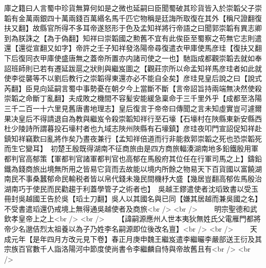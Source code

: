 庫之籍曰人言蜀中珍貨無算何如是之微也延嗣曰臣聞蜀破其珍貨皆入於崇韜父子崇韜有金萬兩銀四十萬兩錢百萬緡名馬千匹它物稱是廷誨所取復在其外【稱尺證翻復扶又翻】故縣官所得不多耳帝遂怒形于色及孟知祥將行帝語之曰聞郭崇韜有異志卿到為朕誅之【為于偽翻】知祥曰崇韜國之勲舊不宜有此俟臣至蜀察之苟無它志則遣還【還從宣翻又如字】帝許之壬子知祥發洛陽帝尋復遣衣甲庫使馬彦珪【復扶又翻下后復同衣甲庫使盛唐無之蓋帝所置亦内諸司使之一也】馳詣成都觀崇韜去就如奉詔班師則已若有遷延跋扈之狀則與繼岌圖之【觀莊宗所以命孟知祥馬彦珪者如此就使李從襲等不以劉后教行之崇韜得東還亦必不能自全矣】彦珪見皇后說之曰【說式芮翻】臣見向延嗣言蜀中事勢憂在朝夕今上當斷不斷【言帝詔旨持兩端無决然使殺崇韜之命斷丁亂翻】夫成敗之機間不容髪安能緩急稟命于三千里外乎【成都至洛陽三千二百一十六里見舊唐書地理志】皇后復言于帝帝曰傳聞之言未知虛實豈可遽爾果决皇后不得請退自為教與繼岌令殺崇韜知祥行至石壕【石壕村在陜縣東新安縣西杜少陵詩所謂暮投石壕村者也九域志陜州陜縣有石壕鎮】彦珪夜叩門宣詔促知祥赴鎮知祥竊歎曰亂將作矣乃晝夜兼行【孟知祥倍道而行非能救郭崇韜之死也恐崇韜死而生它變耳】　初楚王殷既得湖南不征商旅由是四方商旅輻湊湖南地多鉛鐵殷用軍都判官高郁策【軍都判官諸軍都判官也高郁在馬殷府其位任在行軍司馬之上】鑄鉛鐵為錢商旅出境無所用之皆易它貨而去故能以境内所餘之物易天下百貨國以富饒湖南民不事桑蠶郁命民輸税者皆以帛代錢未幾民間機杼大盛【幾居豈翻高郁佐馬殷治湖南巧于使民而民勸趨于利蓋學管子之術者也】　吳越王鏐遣使者沈瑫致書以受玉冊封吳越國王告於吳【瑫土刀翻】吳人以其國名與已同【嫌其居越而兼吳國之名】不受書遣瑫還仍戒境上無得通吳越使者及商旅<br />
<br />
　　明宗聖德和武欽孝皇帝上之上<br />
<br />
　　【諱嗣源應州人世本夷狄無姓氏父電雁門都將帝少名邈佶烈太祖養以為子乃姓李名嗣源即位後改名亶】<br />
<br />
　　天成元年【是年四月方改元見下卷】春正月庚申魏王繼岌遣李繼曮李嚴部送王衍及其宗族百官數千人詣洛陽河中節度使尚書令李繼麟自恃與帝故舊且有<br />
<br />
